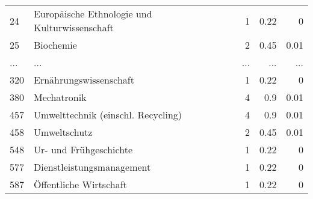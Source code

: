 \begin{longtable}{lXrrr}
        24 & \multicolumn{1}{X}{Europäische Ethnologie und Kulturwissenschaft} & %
          \num{1} &
          \num[round-mode=places,round-precision=2]{0,22} &
          \num[round-mode=places,round-precision=2]{0} \\
        25 & \multicolumn{1}{X}{Biochemie} & %
          \num{2} &
          \num[round-mode=places,round-precision=2]{0,45} &
          \num[round-mode=places,round-precision=2]{0,01} \\
       ... & ... & ... & ... & ... \\
        320 & \multicolumn{1}{X}{Ernährungswissenschaft} & %
          \num{1} &
          \num[round-mode=places,round-precision=2]{0,22} &
          \num[round-mode=places,round-precision=2]{0} \\

        380 & \multicolumn{1}{X}{Mechatronik} & %
          \num{4} &
          \num[round-mode=places,round-precision=2]{0,9} &
          \num[round-mode=places,round-precision=2]{0,01} \\

        457 & \multicolumn{1}{X}{Umwelttechnik (einschl. Recycling)} & %
          \num{4} &
          \num[round-mode=places,round-precision=2]{0,9} &
          \num[round-mode=places,round-precision=2]{0,01} \\

        458 & \multicolumn{1}{X}{Umweltschutz} & %
          \num{2} &
          \num[round-mode=places,round-precision=2]{0,45} &
          \num[round-mode=places,round-precision=2]{0,01} \\

        548 & \multicolumn{1}{X}{Ur- und Frühgeschichte} & %
          \num{1} &
          \num[round-mode=places,round-precision=2]{0,22} &
          \num[round-mode=places,round-precision=2]{0} \\

        577 & \multicolumn{1}{X}{Dienstleistungsmanagement} & %
          \num{1} &
          \num[round-mode=places,round-precision=2]{0,22} &
          \num[round-mode=places,round-precision=2]{0} \\

        587 & \multicolumn{1}{X}{Öffentliche Wirtschaft} & %
          \num{1} &
          \num[round-mode=places,round-precision=2]{0,22} &
          \num[round-mode=places,round-precision=2]{0} \\


\end{longtable}
